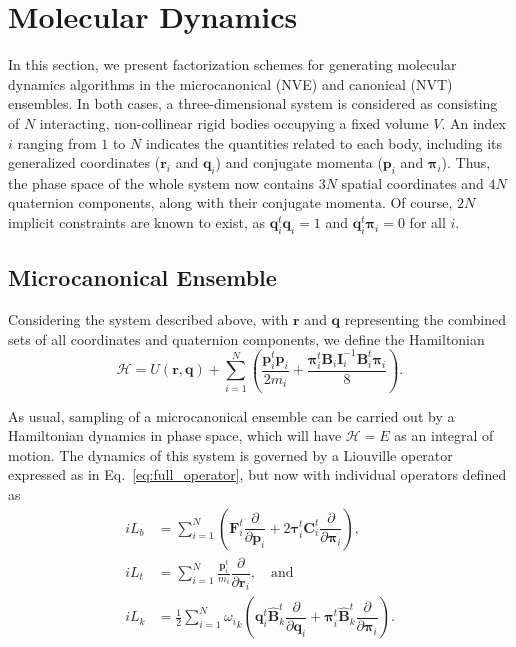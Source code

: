 \documentclass[aip,jcp,reprint,amsmath,amssymb,raggedbottom]{revtex4-1}
\newcommand{\mt}[1]{\boldsymbol{\mathbf{#1}}}           %
\newcommand{\vt}[1]{\boldsymbol{\mathbf{#1}}}           %
\newcommand{\tr}[1]{#1^t}                               %
\newcommand{\diff}[2]{\dfrac{\partial #1}{\partial #2}} %
\begin{document}
\section{Molecular Dynamics}
\label{sec:molecular_dynamics}

In this section, we present factorization schemes for generating molecular dynamics algorithms in the microcanonical (NVE) and canonical (NVT) ensembles. In both cases, a three-dimensional system is considered as consisting of $N$ interacting, non-collinear rigid bodies occupying a fixed volume $V$. An index $i$ ranging from $1$ to $N$ indicates the quantities related to each body, including its generalized coordinates ($\vt r_i$ and $\vt q_i$) and conjugate momenta ($\vt p_i$ and $\vt \pi_i$). Thus, the phase space of the whole system now contains $3N$ spatial coordinates and $4N$ quaternion components, along with their conjugate momenta. Of course, $2N$ implicit constraints are known to exist, as $\tr{\vt q}_i{\vt q}_i = 1$ and $\tr{\vt q}_i{\vt \pi}_i = 0$ for all $i$.

\subsection{Microcanonical Ensemble}

Considering the system described above, with $\vt r$ and $\vt q$ representing the combined sets of all coordinates and quaternion components, we define the Hamiltonian
\begin{equation}
\label{eq:H_NVE}
\mathcal{H} = U(\vt r,\vt q) + \sum_{i=1}^N \left(\frac{\tr{\vt p}_i{\vt p}_i}{2m_i} + \frac{\tr{\vt \pi}_i {\mt B}_i {\mt I}_i^{-1} \tr{\mt B}_i {\vt \pi}_i}{8}\right).
\end{equation}

As usual, sampling of a microcanonical ensemble can be carried out by a Hamiltonian dynamics in phase space, which will have $\mathcal{H} = E$ as an integral of motion. The dynamics of this system is governed by a Liouville operator expressed as in Eq.~\ref{eq:full_operator}, but now with individual operators defined as
\[
\begin{split}
i\!L_b &= \sum_{i=1}^N \left( \tr{\vt F}_i \diff{}{\vt p_i} + 2 \tr{\vt \tau}_i \tr{\mt C}_i \diff{}{\vt \pi_i} \right), \\
i\!L_t &= \sum_{i=1}^N \frac{\tr{\vt p}_i}{m_i}\diff{}{\vt r_i}, \quad \text{and} \\
i\!L_k &= \frac{1}{2} \sum_{i=1}^N {\omega_i}_k \left( \tr{\vt q}_i\tr{\hat{\mt B}_k} \diff{}{\vt q_i} + \tr{\vt \pi_i}\tr{\hat{\mt B}_k} \diff{}{\vt \pi_i} \right).
\end{split}
\]
\end{document}
